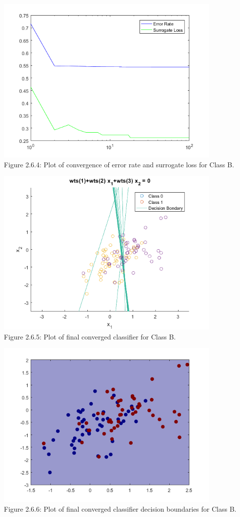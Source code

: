 \documentclass[]{report}   %
\begin{document}
\begin{center}
	\includegraphics[width=30em,keepaspectratio]{2_6_Figure_4.png}\\
	{Figure 2.6.4: Plot of convergence of error rate and surrogate loss for Class B.}
\end{center} 

\begin{center}
	\includegraphics[width=30em,keepaspectratio]{2_6_Figure_5.png}\\
	{Figure 2.6.5: Plot of final converged classifier for Class B.}
\end{center} 


\begin{center}
	\includegraphics[width=30em,keepaspectratio]{2_6_Figure_6.png}\\
	{Figure 2.6.6: Plot of final converged classifier decision boundaries for Class B.}
\end{center} 
\end{document}
